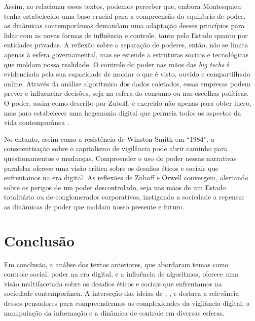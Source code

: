 \documentclass[
	12pt,
	openright,
	twoside,
	a4paper,
	english,
	french,
	spanish,
	brazil
]{abntex2}
\begin{document}
  Assim, ao relacionar esses textos, podemos perceber que, embora Montesquieu
  tenha estabelecido uma base crucial para a compreensão do equilíbrio de poder,
  as dinâmicas contemporâneas demandam uma adaptação desses princípios para
  lidar com as novas formas de influência e controle, tanto pelo Estado quanto
  por entidades privadas. A reflexão sobre a separação de poderes, então, não
  se limita apenas à esfera governamental, mas se estende a estruturas sociais e
  tecnológicas que moldam nossa realidade. O controle do poder nas mãos das
  \textit{big techs} é evidenciado pela sua capacidade de moldar o que é visto,
  ouvido e compartilhado online. Através da análise algorítmica dos dados
  coletados, essas empresas podem prever e influenciar decisões, seja na esfera
  do consumo ou nas escolhas políticas. O poder, assim como descrito por Zuboff,
  é exercido não apenas para obter lucro, mas para estabelecer uma hegemonia
  digital que permeia todos os aspectos da vida contemporânea
  \cite{zuboff-capitalismo-vigilancia}.

  No entanto, assim como a resistência de Winston Smith em ``1984'', a
  conscientização sobre o capitalismo de vigilância pode abrir caminho para
  questionamentos e mudanças. Compreender o uso do poder nessas narrativas
  paralelas oferece uma visão crítica sobre os desafios éticos e sociais que
  enfrentamos na era digital. As reflexões de Zuboff e Orwell convergem,
  alertando sobre os perigos de um poder descontrolado, seja nas mãos de um
  Estado totalitário ou de conglomerados corporativos, instigando a sociedade a
  repensar as dinâmicas de poder que moldam nosso presente e futuro.

  \chapter{Conclusão}

  Em conclusão, a análise dos textos anteriores, que abordaram temas como
  controle social, poder na era digital, e a influência de algoritmos, oferece
  uma visão multifacetada sobre os desafios éticos e sociais que enfrentamos na
  sociedade contemporânea. A interseção das ideias de
  , ,
   e
   destaca a relevância desses pensadores
  para compreendermos as complexidades da vigilância digital, a manipulação da
  informação e a dinâmica de controle em diversas esferas.
\end{document}
